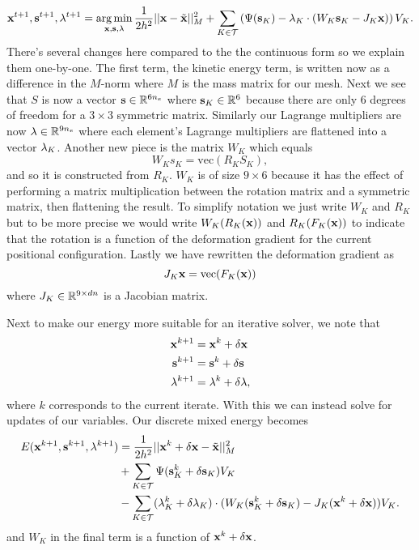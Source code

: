 \begin{equation}
\mathbf{x}^{t+1}, \mathbf{s}^{t+1}, \mathbf{\lambda}^{t+1} = \operatorname*{arg\,min}_{\mathbf{x},\mathbf{s},\mathbf{\lambda}} \frac{1}{2h^2}||\mathbf{x} - \tilde{\mathbf{x}}||_M^2 
+ \sum_{K \in \mathcal{T}} \left( \Psi(\mathbf{s}_K) - \mathbf{\lambda}_K \cdot (W_K \mathbf{s}_K - J_K \mathbf{x}) \right) V_K.
\end{equation}
There's several changes here compared to the the continuous form so we explain them one-by-one. The first term, the kinetic energy term, is written now as a difference in the $M$-norm where $M$ is the mass matrix for our mesh. Next we see that $S$ is now a vector $\mathbf{s} \in \mathbb{R}^{6n_e}$ where $\mathbf{s}_K \in \mathbb{R}^6$ because there are only 6 degrees of freedom for a $3 \times 3$ symmetric matrix. Similarly our Lagrange multipliers are now $\mathbf{\lambda} \in \mathbb{R}^{9n_e}$ where each element's Lagrange multipliers are flattened into a vector $\mathbf{\lambda}_K$. Another new piece is the matrix $W_K$ which equals
\begin{equation}
W_K s_K = \text{vec}(R_K S_K),
\end{equation}
and so it is constructed from $R_K$. $W_K$ is of size $9 \times 6$ because it has the effect of performing a matrix multiplication between the rotation matrix and a symmetric matrix, then flattening the result. To simplify notation we just write $W_K$ and $R_K$ but to be more precise we would write $W_K(R_K(\mathbf{x}))$ and $R_K(F_K(\mathbf{x}))$ to indicate that the rotation is a function of the deformation gradient for the current positional configuration.  Lastly we have rewritten the deformation gradient as
\begin{equation}
J_K \mathbf{x} = \text{vec}(F_K(\mathbf{x}))
\end{equation}
where $J_K \in \mathbb{R}^{9 \times dn}$ is a Jacobian matrix. 

Next to make our energy more suitable for an iterative solver, we note that
\begin{align*}
\mathbf{x}^{k+1} &= \mathbf{x}^k + \delta \mathbf{x} \\
\mathbf{s}^{k+1} &= \mathbf{s}^k + \delta \mathbf{s} \\
\mathbf{\lambda}^{k+1} &= \mathbf{\lambda}^k + \delta \mathbf{\lambda},
\end{align*}
where $k$ corresponds to the current iterate. With this we can instead solve for updates of our variables. Our discrete mixed energy becomes
\begin{equation}
\begin{split}
E(\mathbf{x}^{k+1}, \mathbf{s}^{k+1}, \mathbf{\lambda}^{k+1}) &= \frac{1}{2h^2}||\mathbf{x}^k + \delta \mathbf{x} - \tilde{\mathbf{x}}||_M^2 \\
&+ \sum_{K \in \mathcal{T}} \Psi(\mathbf{s}_K^k + \delta \mathbf{s}_K) V_K  \\
&-  \sum_{K \in \mathcal{T}} (\mathbf{\lambda}_K^k + \delta \mathbf{\lambda}_K) \cdot (W_K (\mathbf{s}_K^k + \delta \mathbf{s}_K) - J_K(\mathbf{x}^k + \delta \mathbf{x})) V_K.
\end{split}
\end{equation}
and $W_K$ in the final term is a function of $\mathbf{x}^k + \delta \mathbf{x}$. 

